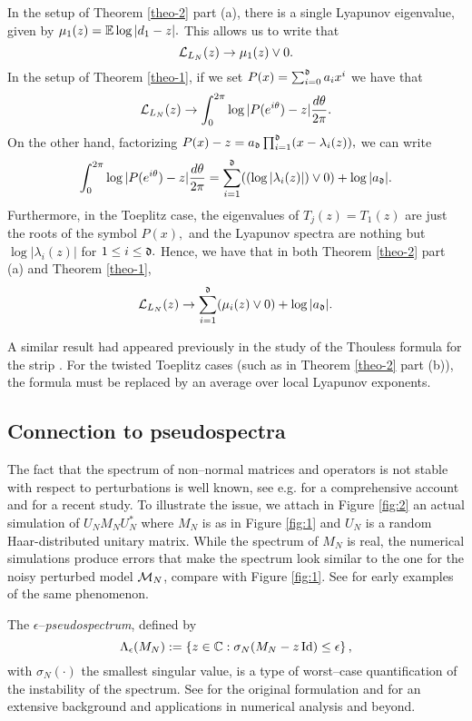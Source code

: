 \documentclass{amsart}
\numberwithin{equation}{section}
\def\corABa{}
\def\corOZ{}
\begin{document}
In the setup of Theorem \ref{theo-2} part (a), there is a single Lyapunov eigenvalue, given by $\mu_1(z) = \mathbb{E} \log |d_1 - z|.$  This allows us to write that
\[
  \LL_{L_N}(z) \to \corOZ{\mu_1(z)} \vee 0.
\]
In the setup of Theorem \ref{theo-1}, if we set $P(x) = \sum_{i=0}^{\mathfrak{d}} a_i x^i$ we \corABa{have that} %
\[
\mathcal{L}_{L_N}(z) \to \int_0^{2\pi} \log |P(e^{i\theta})-z|\frac{d\theta}{2\pi}.
\]
On the other hand, factorizing $P(x) - z = a_{\mathfrak{d}} \prod_{i=1}^{\mathfrak{d}} (x-\lambda_i(z)),$ we can write
\[
\int_0^{2\pi} \log |P(e^{i\theta})-z|\frac{d\theta}{2\pi}
= \sum_{i=1}^{\mathfrak{d}}  ((\log |\lambda_i(z)|) \vee 0)+\log |a_{\mathfrak{d}}|.
\]
Furthermore, in the Toeplitz case, the eigenvalues of $T_j(z) = T_1(z)$ are just the roots of the symbol $P(x),$ and the Lyapunov spectra are nothing but $\log | \lambda_i(z)|$ for $1 \leq i \leq \mathfrak{d}.$  Hence, we have that in both Theorem \ref{theo-2} part (a) and Theorem \ref{theo-1},
\[
\mathcal{L}_{L_N}(z) \to \sum_{i=1}^{\mathfrak{d}} ( \mu_i(z) \vee 0)+\log|a_{\mathfrak{d}}|.
\]

A \corABa{similar result had} appeared previously in the study of the Thouless formula for \corOZ{the strip \cite[Theorem 2.4]{CraigSimon}.}
For the twisted Toeplitz cases (such as in Theorem \ref{theo-2} part (b)), the formula must be replaced by an average over local Lyapunov exponents.

\subsection{Connection to pseudospectra}
\label{subsec-1.3}
\par
The fact that the spectrum of non--normal matrices and operators
is not stable with respect
to perturbations is well known, see e.g. \cite{trefethen} for a
comprehensive account and \cite{DH}
for a recent study.
To illustrate the issue,
we attach in Figure \ref{fig:2} an
actual simulation of $U_N M_N U_N^*$ where $M_N$ is as in Figure
\ref{fig:1} and $U_N$
is a random Haar-distributed
unitary matrix. While the spectrum of $M_N$ is real, the numerical
simulations produce errors that make the spectrum look similar to
the one for the noisy perturbed model $\mathcal{M}_N$, compare with
Figure \ref{fig:1}. See \cite{Trefethen1991} for early 
examples of the same phenomenon.


The $\epsilon$--\emph{pseudospectrum}, defined by
  \[
    \Lambda_\epsilon(M_N): = \left\{ z \in \mathbb{C} : \sigma_N(M_N-z\operatorname{Id}) \leq \epsilon \right\},
  \]
  with $\sigma_N(\cdot)$ the smallest singular value,
  is a type of worst--case quantification of the instability of the spectrum.
  See \cite{Trefethen1991} for the original formulation and
  \cite{trefethen} for an extensive background
and applications in numerical analysis and beyond.
\end{document}
